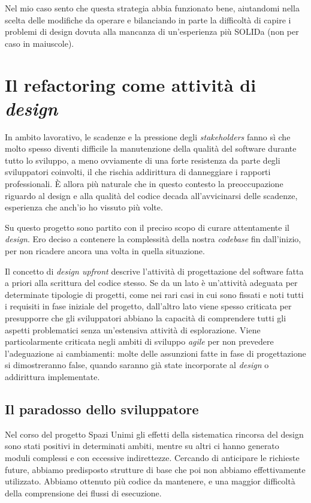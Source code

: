 \documentclass[12pt]{report}
\begin{document}
Nel mio caso sento che questa strategia abbia funzionato bene, aiutandomi
nella scelta delle modifiche da operare e bilanciando in parte la
difficoltà di capire i problemi di design dovuta alla mancanza di un'esperienza
più SOLIDa (non per caso in maiuscole).


%
%
% 
%
%
\chapter{Il refactoring come attività di \textit{design}}
\label{cap:refactoring_come_design}

In ambito lavorativo, le scadenze e la pressione degli \textit{stakeholders}
fanno sì che molto spesso diventi difficile la manutenzione 
della qualità del software durante tutto lo sviluppo, 
a meno ovviamente di una forte resistenza da parte degli sviluppatori 
coinvolti, il che rischia addirittura di danneggiare
i rapporti professionali. È allora più naturale che in questo contesto la
preoccupazione riguardo al design e alla qualità del codice decada 
all'avvicinarsi delle scadenze, esperienza che anch'io ho vissuto più volte.

Su questo progetto sono partito 
con il preciso scopo di curare attentamente il \textit{design}. Ero
deciso a contenere la complessità della nostra \textit{codebase}
fin dall'inizio, per non ricadere ancora una volta in quella
situazione. 

Il concetto di \textit{design upfront} descrive l'attività di 
progettazione del software fatta a priori alla scrittura del codice 
stesso. Se da un lato è un'attività adeguata per determinate
tipologie di progetti, come nei rari casi in cui sono fissati e noti tutti i
requisiti in fase iniziale del progetto, dall'altro lato viene spesso criticata
per presupporre che gli sviluppatori abbiano la capacità di comprendere
tutti gli aspetti problematici senza un'estensiva attività di esplorazione. 
Viene particolarmente criticata negli ambiti di sviluppo \textit{agile} 
per non prevedere l'adeguazione ai cambiamenti: molte delle assunzioni
fatte in fase di progettazione si dimostreranno false, quando saranno già
state incorporate al \textit{design} o addirittura implementate. 

\section{Il paradosso dello sviluppatore}

Nel corso del progetto Spazi Unimi gli effetti della sistematica
rincorsa del design sono stati positivi in determinati ambiti, mentre 
su altri ci hanno generato moduli complessi e con eccessive indirettezze. 
Cercando di anticipare le richieste future, abbiamo predisposto strutture di 
base che poi non abbiamo effettivamente utilizzato. Abbiamo 
ottenuto più codice da mantenere, e una maggior difficoltà della 
comprensione dei flussi di esecuzione. 
\end{document}
